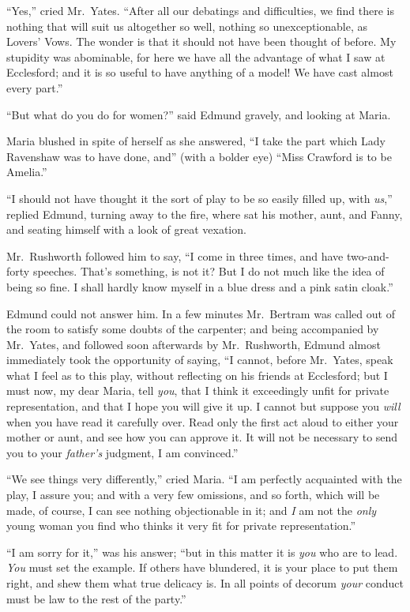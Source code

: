 ``Yes,'' cried Mr.\ Yates.  ``After all our debatings
and difficulties, we find there is nothing that will
suit us altogether so well, nothing so unexceptionable,
as Lovers' Vows.  The wonder is that it should not have been
thought of before.  My stupidity was abominable, for here
we have all the advantage of what I saw at Ecclesford;
and it is so useful to have anything of a model!
We have cast almost every part.''

``But what do you do for women?'' said Edmund gravely,
and looking at Maria.

Maria blushed in spite of herself as she answered,
``I take the part which Lady Ravenshaw was to have done,
and'' (with a bolder eye) ``Miss Crawford is to be Amelia.''

``I should not have thought it the sort of play to be so
easily filled up, with \emph{us},'' replied Edmund, turning away
to the fire, where sat his mother, aunt, and Fanny,
and seating himself with a look of great vexation.

Mr.\ Rushworth followed him to say, ``I come in three times,
and have two-and-forty speeches.  That's something,
is not it?  But I do not much like the idea of being so fine.
I shall hardly know myself in a blue dress and a pink
satin cloak.''

Edmund could not answer him.  In a few minutes Mr.\ Bertram
was called out of the room to satisfy some doubts
of the carpenter; and being accompanied by Mr.\ Yates,
and followed soon afterwards by Mr.\ Rushworth, Edmund almost
immediately took the opportunity of saying, ``I cannot,
before Mr.\ Yates, speak what I feel as to this play,
without reflecting on his friends at Ecclesford;
but I must now, my dear Maria, tell \emph{you}, that I
think it exceedingly unfit for private representation,
and that I hope you will give it up.  I cannot but suppose
you \emph{will} when you have read it carefully over.
Read only the first act aloud to either your mother or aunt,
and see how you can approve it.  It will not be necessary
to send you to your \emph{father's} judgment, I am convinced.''

``We see things very differently,'' cried Maria.
``I am perfectly acquainted with the play, I assure you;
and with a very few omissions, and so forth, which will
be made, of course, I can see nothing objectionable in it;
and \emph{I} am not the \emph{only} young woman you find who thinks
it very fit for private representation.''

``I am sorry for it,'' was his answer; ``but in this matter
it is \emph{you} who are to lead.  \emph{You} must set the example.
If others have blundered, it is your place to put
them right, and shew them what true delicacy is.
In all points of decorum \emph{your} conduct must be law
to the rest of the party.''

